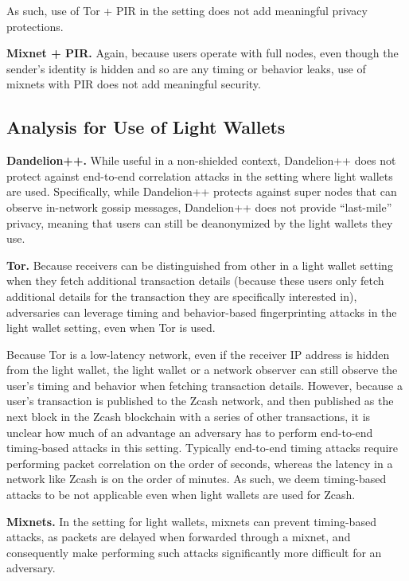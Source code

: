 \documentclass{article}
\begin{document}
As such, use of Tor + PIR in the setting does not add meaningful privacy
protections.

\textbf{Mixnet + PIR.}
Again, because users operate with full nodes, even though the sender's identity
is hidden and so are any timing or behavior leaks, use of mixnets with PIR does
not add meaningful security.

\subsection{Analysis for Use of Light Wallets}

\textbf{Dandelion++.}
While useful in a non-shielded context, Dandelion++ does not protect against
end-to-end correlation attacks in the setting where light wallets are used.
Specifically, while Dandelion++ protects against super nodes that can observe
in-network gossip messages, Dandelion++ does not provide ``last-mile'' privacy,
meaning that users can still be deanonymized by the light wallets they use.

\textbf{Tor.}
Because receivers can be distinguished from other in a light wallet setting
when they fetch additional transaction details (because these users only fetch
additional details for the transaction they are specifically interested in),
adversaries can leverage timing and behavior-based fingerprinting attacks in
the light wallet setting, even when Tor is used.

Because Tor is a low-latency
network, even if the receiver IP address is hidden from the light wallet, the
light wallet or a network observer can still observe the user's timing and
behavior when fetching transaction details. However, because a user's
transaction is published to the Zcash network, and then published as the next
block in the Zcash blockchain with a series of other transactions, it is
unclear how much of an advantage an adversary has to perform end-to-end
timing-based attacks in this setting. Typically end-to-end timing attacks
require performing packet correlation on the order of seconds, whereas the
latency in a network like Zcash is on the order of minutes. As such, we deem
timing-based attacks to be not applicable even when light wallets are used for
Zcash.

\textbf{Mixnets.}
In the setting for light wallets, mixnets can prevent timing-based attacks, as
packets are delayed when forwarded through a mixnet, and consequently make
performing such attacks significantly more difficult for an adversary.
\end{document}
